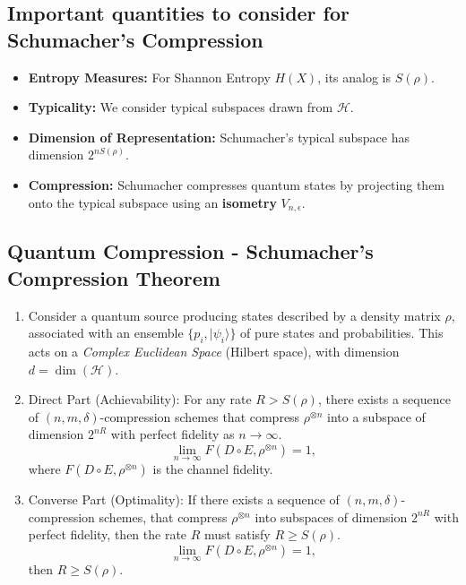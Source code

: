 \subsection{Important quantities to consider for Schumacher's Compression}

\begin{itemize}
\item \textbf{Entropy Measures:}
For Shannon Entropy \(H(X)\), its analog is \(S(\rho)\).

\item \textbf{Typicality:}
We consider typical subspaces drawn from \(\mathcal{H}\).

\item \textbf{Dimension of Representation:}
Schumacher's typical subspace has dimension \(2^{nS(\rho)}\).

\item \textbf{Compression:}
Schumacher compresses quantum states by projecting them onto the typical subspace using an \textbf{isometry} \(V_{n,\epsilon}\).

\end{itemize}

\subsection{Quantum Compression - Schumacher's Compression Theorem}

\begin{enumerate}

\item Consider a quantum source producing states described by a density matrix \(\rho\), associated with an ensemble \(\{p_i, |\psi_i\rangle\}\) of pure states and probabilities. This acts on a \textit{Complex Euclidean Space} (Hilbert space), with dimension \(d = \dim(\mathcal{H})\). 

\item Direct Part (Achievability): For any rate \(R > S(\rho)\), there exists a sequence of \((n, m, \delta)\)-compression schemes that compress \(\rho^{\otimes n}\) into a subspace of dimension \(2^{nR}\) with perfect fidelity as \(n \to \infty\).
\[
\lim_{n \to \infty} F(D \circ E, \rho^{\otimes n}) = 1,
\]
where \(F(D \circ E, \rho^{\otimes n})\) is the channel fidelity.

\item Converse Part (Optimality): If there exists a sequence of \((n, m, \delta)\)-compression schemes, that compress \(\rho^{\otimes n}\) into subspaces of dimension \(2^{nR}\) with perfect fidelity, then the rate \(R\) must satisfy \(R \geq S(\rho)\).
\[
\lim_{n \to \infty} F(D \circ E, \rho^{\otimes n}) = 1,
\]
then \(R \geq S(\rho)\).

\end{enumerate}

